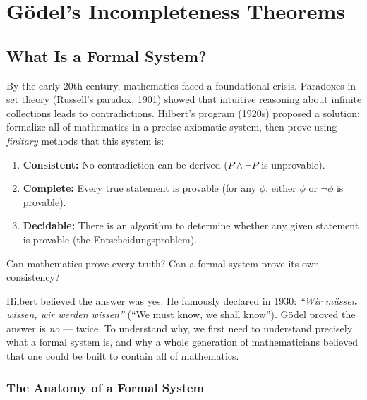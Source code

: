 
\chapter{Gödel's Incompleteness Theorems}
\label{ch:godel}

\section{What Is a Formal System?}
\label{sec:godel:formalsystem}

By the early 20th century, mathematics faced a foundational crisis. Paradoxes in set theory (Russell's paradox, 1901) showed that intuitive reasoning about infinite collections leads to contradictions. Hilbert's program (1920s) proposed a solution: formalize all of mathematics in a precise axiomatic system, then prove using \emph{finitary} methods that this system is:

\begin{enumerate}
\item \textbf{Consistent:} No contradiction can be derived ($P \land \neg P$ is unprovable).
\item \textbf{Complete:} Every true statement is provable (for any $\phi$, either $\phi$ or $\neg\phi$ is provable).
\item \textbf{Decidable:} There is an algorithm to determine whether any given statement is provable (the Entscheidungsproblem).
\end{enumerate}

Can mathematics prove every truth? Can a formal system prove its own consistency?

Hilbert believed the answer was yes. He famously declared in 1930: \emph{``Wir müssen wissen, wir werden wissen''} (``We must know, we shall know''). Gödel proved the answer is \emph{no} --- twice. To understand why, we first need to understand precisely what a formal system is, and why a whole generation of mathematicians believed that one could be built to contain all of mathematics.

\subsection{The Anatomy of a Formal System}
\label{sec:godel:anatomy}

